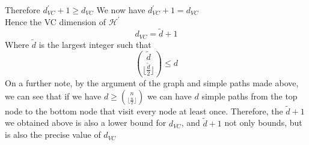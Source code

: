 \documentclass[11pt]{article}
\theoremstyle{definition}
\begin{document}
 Therefore $d^\prime_{VC} + 1 \geq d_{VC}$
 We now have $d^\prime_{VC} + 1 = d_{VC}$ \\
 Hence the VC dimension of $\mathcal{H}^\prime$ 
 \[
   d_{VC} = \tilde{d} + 1
 \]
 Where $\tilde{d}$ is the largest integer such that 
 \[
   {\tilde{d}\choose \lfloor\frac{\tilde{d}}{2}\rfloor} \leq d
 \]
 \bigbreak
 On a further note, by the argument of the graph and simple paths made above, we can see that if we have $d \geq {n\choose \lfloor\frac{n}{2}\rfloor}$ we can have $d$ simple paths from the top node to the bottom node that visit every node at least once. Therefore, the $\tilde{d} + 1$ we obtained above is also a lower bound for $d_{VC}$, and $\tilde{d} + 1$ not only bounds, but is also the precise value of $d_{VC}$
\end{document}
